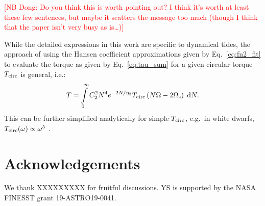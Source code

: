 \documentclass[
        fleqn,
        usenatbib,
    ]{mnras}
\newcommand*{\p}[1]{\left(#1\right)}
\begin{document}
\textcolor{red}{[NB Dong: Do you think this is worth pointing out? I think it's
worth at least these few sentences, but maybe it scatters the message too much
(though I think that the paper isn't very busy as is\dots)]}

While the detailed expressions in this work are specific to dynamical tides, the
approach of using the Hansen coefficient approximations given by
Eq.~\eqref{eq:fn2_fit} to evaluate the torque as given by
Eq.~\eqref{eq:tau_sum} for a given circular torque $T_{\rm circ}$ is general,
i.e.:
\begin{equation}
    T = \int\limits_0^\infty C_2^2 N^{4}e^{-2N / \eta_2}T_{\rm circ}
        \p{N\Omega - 2\Omega_{\rm s}}\;\mathrm{d}N.
\end{equation}
This can be further simplified analytically for simple $T_{\rm circ}$, e.g.\ in
white dwarfs, $T_{\rm circ}(\omega) \propto \omega^5$
\citep{fuller2012dynamical}.


\section{Acknowledgements}


We thank XXXXXXXXX for fruitful discussions. YS is supported by the NASA FINESST
grant 19-ASTRO19-0041.





\bsp
\label{lastpage} %
\end{document}
